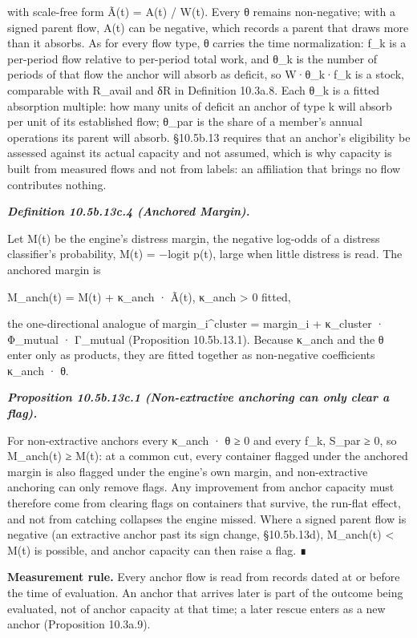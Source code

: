 \documentclass[
]{article}
\begin{document}
with scale-free form Ã(t) = A(t) / W(t). Every θ remains non-negative;
with a signed parent flow, A(t) can be negative, which records a parent
that draws more than it absorbs. As for every flow type, θ carries the
time normalization: f\_k is a per-period flow relative to per-period
total work, and θ\_k is the number of periods of that flow the anchor
will absorb as deficit, so W·θ\_k·f\_k is a stock, comparable with
R\_avail and δR in Definition 10.3a.8. Each θ\_k is a fitted absorption
multiple: how many units of deficit an anchor of type k will absorb per
unit of its established flow; θ\_par is the share of a member's annual
operations its parent will absorb. §10.5b.13 requires that an anchor's
eligibility be assessed against its actual capacity and not assumed,
which is why capacity is built from measured flows and not from labels:
an affiliation that brings no flow contributes nothing.

\emph{\textbf{Definition 10.5b.13c.4 (Anchored Margin).}}

Let M(t) be the engine's distress margin, the negative log-odds of a
distress classifier's probability, M(t) = −logit p(t), large when little
distress is read. The anchored margin is

M\_anch(t) = M(t) + κ\_anch · Ã(t), κ\_anch \textgreater{} 0 fitted,

the one-directional analogue of margin\_i\^{}cluster = margin\_i +
κ\_cluster · Φ\_mutual · Γ\_mutual (Proposition 10.5b.13.1). Because
κ\_anch and the θ enter only as products, they are fitted together as
non-negative coefficients κ\_anch · θ.

\emph{\textbf{Proposition 10.5b.13c.1 (Non-extractive anchoring can only
clear a flag).}}

For non-extractive anchors every κ\_anch · θ ≥ 0 and every f\_k, S\_par
≥ 0, so M\_anch(t) ≥ M(t): at a common cut, every container flagged
under the anchored margin is also flagged under the engine's own margin,
and non-extractive anchoring can only remove flags. Any improvement from
anchor capacity must therefore come from clearing flags on containers
that survive, the run-flat effect, and not from catching collapses the
engine missed. Where a signed parent flow is negative (an extractive
anchor past its sign change, §10.5b.13d), M\_anch(t) \textless{} M(t) is
possible, and anchor capacity can then raise a flag. ∎

\textbf{Measurement rule.} Every anchor flow is read from records dated
at or before the time of evaluation. An anchor that arrives later is
part of the outcome being evaluated, not of anchor capacity at that
time; a later rescue enters as a new anchor (Proposition 10.3a.9).
\end{document}
